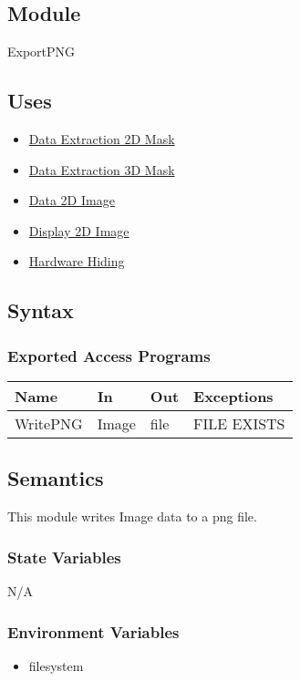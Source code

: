 \documentclass[12pt, titlepage]{article}
\begin{document}
\subsection{Module}

ExportPNG

\subsection{Uses}
\begin{itemize}
    \item \hyperref[Mod:Mask2D]{Data Extraction 2D Mask}
    \item \hyperref[Mod:Mask3D]{Data Extraction 3D Mask}
    \item \hyperref[Mod:Image]{Data 2D Image}
    \item \hyperref[Mod:Disp1D]{Display 2D Image}
    \item \hyperref[Mod:HH]{Hardware Hiding}
\end{itemize}

\subsection{Syntax}

\subsubsection{Exported Access Programs}

\begin{center}
    \begin{tabular}{p{2cm} p{4cm} p{4cm} p{4cm}}
        \hline
        \textbf{Name} & \textbf{In} & \textbf{Out} & \textbf{Exceptions} \\
        \hline
        WritePNG & Image & file & FILE EXISTS \\
        \hline
    \end{tabular}
\end{center}

\subsection{Semantics}
This module writes Image data to a png file.

\subsubsection{State Variables}
N/A

\subsubsection{Environment Variables}
\begin{itemize}
    \item filesystem
\end{itemize}
\end{document}
